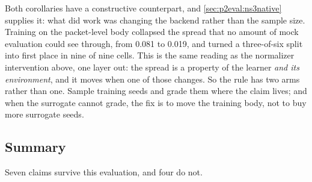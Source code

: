 Both corollaries have a constructive counterpart, and \cref{sec:p2eval:ns3native} supplies it: what did
work was changing the backend rather than the sample size. Training on the packet-level body collapsed
the spread that no amount of mock evaluation could see through, from 0.081 to 0.019, and turned a
three-of-six split into first place in nine of nine cells. This is the same reading as the normalizer
intervention above, one layer out: the spread is a property of the learner \emph{and its environment},
and it moves when one of those changes. So the rule has two arms rather than one. Sample training seeds
and grade them where the claim lives; and when the surrogate cannot grade, the fix is to move the
training body, not to buy more surrogate seeds.

\subsection{Summary}
\label{sec:p2eval:summary}

Seven claims survive this evaluation, and four do not.

